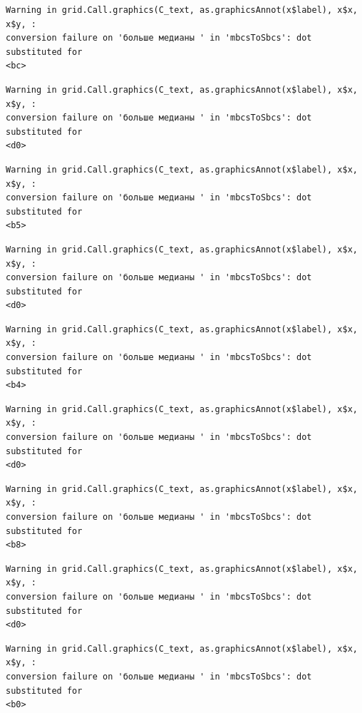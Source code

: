 \documentclass[
  letterpaper,
]{scrbook}
\theoremstyle{definition}
\theoremstyle{remark}
\begin{document}
\begin{verbatim}
Warning in grid.Call.graphics(C_text, as.graphicsAnnot(x$label), x$x, x$y, :
conversion failure on 'больше медианы ' in 'mbcsToSbcs': dot substituted for
<bc>
\end{verbatim}

\begin{verbatim}
Warning in grid.Call.graphics(C_text, as.graphicsAnnot(x$label), x$x, x$y, :
conversion failure on 'больше медианы ' in 'mbcsToSbcs': dot substituted for
<d0>
\end{verbatim}

\begin{verbatim}
Warning in grid.Call.graphics(C_text, as.graphicsAnnot(x$label), x$x, x$y, :
conversion failure on 'больше медианы ' in 'mbcsToSbcs': dot substituted for
<b5>
\end{verbatim}

\begin{verbatim}
Warning in grid.Call.graphics(C_text, as.graphicsAnnot(x$label), x$x, x$y, :
conversion failure on 'больше медианы ' in 'mbcsToSbcs': dot substituted for
<d0>
\end{verbatim}

\begin{verbatim}
Warning in grid.Call.graphics(C_text, as.graphicsAnnot(x$label), x$x, x$y, :
conversion failure on 'больше медианы ' in 'mbcsToSbcs': dot substituted for
<b4>
\end{verbatim}

\begin{verbatim}
Warning in grid.Call.graphics(C_text, as.graphicsAnnot(x$label), x$x, x$y, :
conversion failure on 'больше медианы ' in 'mbcsToSbcs': dot substituted for
<d0>
\end{verbatim}

\begin{verbatim}
Warning in grid.Call.graphics(C_text, as.graphicsAnnot(x$label), x$x, x$y, :
conversion failure on 'больше медианы ' in 'mbcsToSbcs': dot substituted for
<b8>
\end{verbatim}

\begin{verbatim}
Warning in grid.Call.graphics(C_text, as.graphicsAnnot(x$label), x$x, x$y, :
conversion failure on 'больше медианы ' in 'mbcsToSbcs': dot substituted for
<d0>
\end{verbatim}

\begin{verbatim}
Warning in grid.Call.graphics(C_text, as.graphicsAnnot(x$label), x$x, x$y, :
conversion failure on 'больше медианы ' in 'mbcsToSbcs': dot substituted for
<b0>
\end{verbatim}
\end{document}
